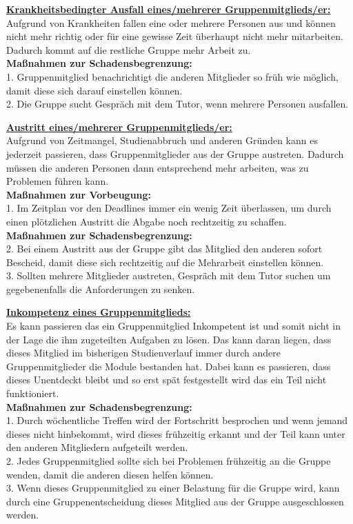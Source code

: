 \documentclass[fontsize=12pt,paper=a4,twoside]{scrartcl}
\begin{document}
\bigskip 

\textbf{\underline{Krankheitsbedingter Ausfall eines/mehrerer Gruppenmitglieds/er:}}\\
Aufgrund von Krankheiten fallen eine oder mehrere Personen aus und können nicht mehr richtig oder für eine gewisse Zeit überhaupt nicht mehr mitarbeiten. Dadurch kommt auf die restliche Gruppe mehr Arbeit zu.\\
\textbf{Maßnahmen zur Schadensbegrenzung:}\\
1. Gruppenmitglied benachrichtigt die anderen Mitglieder so früh wie möglich, damit diese sich darauf einstellen können.\\
2. Die Gruppe sucht Gespräch mit dem Tutor, wenn mehrere Personen ausfallen.\\

\bigskip 

\textbf{\underline{Austritt eines/mehrerer Gruppenmitglieds/er:}}\\
Aufgrund von Zeitmangel, Studienabbruch und anderen Gründen kann es jederzeit passieren, dass Gruppenmitglieder aus der Gruppe austreten. Dadurch müssen die anderen Personen dann entsprechend mehr arbeiten, was zu Problemen führen kann.\\
\textbf{Maßnahmen zur Vorbeugung:}\\
1. Im Zeitplan vor den Deadlines immer ein wenig Zeit überlassen, um durch einen plötzlichen Austritt die Abgabe noch rechtzeitig zu schaffen.\\
\textbf{Maßnahmen zur Schadensbegrenzung:}\\
2. Bei einem Austritt aus der Gruppe gibt das Mitglied den anderen sofort Bescheid, damit diese sich rechtzeitig auf die Mehrarbeit einstellen können.\\
3. Sollten mehrere Mitglieder austreten, Gespräch mit dem Tutor suchen um gegebenenfalls die Anforderungen zu senken.\\

\bigskip 

\textbf{\underline{Inkompetenz eines Gruppenmitglieds:}}\\
Es kann passieren das ein Gruppenmitglied Inkompetent ist und somit nicht in der Lage die ihm zugeteilten Aufgaben zu lösen. Das kann daran liegen, dass dieses Mitglied im bisherigen Studienverlauf immer durch andere Gruppenmitglieder die Module bestanden hat. Dabei kann es passieren, dass dieses Unentdeckt bleibt und so erst spät festgestellt wird das ein Teil nicht funktioniert.\\
\textbf{Maßnahmen zur Schadensbegrenzung:}\\
1. Durch wöchentliche Treffen wird der Fortschritt besprochen und wenn jemand dieses nicht hinbekommt, wird dieses frühzeitig erkannt und der Teil kann unter den anderen Mitgliedern aufgeteilt werden.\\
2. Jedes Gruppenmitglied sollte sich bei Problemen frühzeitig an die Gruppe wenden, damit die anderen diesen helfen können. \\
3. Wenn dieses Gruppenmitglied zu einer Belastung für die Gruppe wird, kann durch eine Gruppenentscheidung dieses Mitglied aus der Gruppe ausgeschlossen werden. \\
\end{document}
